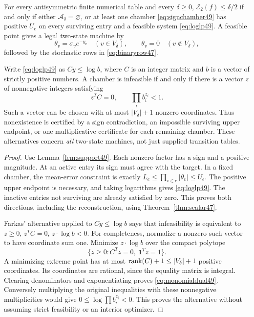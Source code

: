 \begin{theorem}\label{thm:duality49}
For every antisymmetric finite numerical table and every $\delta\ge0$,
$\mathcal E_2(f)\le\delta/2$ if and only if either
$\mathcal A_\delta=\varnothing$, or at least one chamber
\eqref{eq:signchamber49} has positive $U_e$ on every surviving entry
and a feasible system \eqref{eq:loglp49}. A feasible point gives a
legal two-state machine by
\[
 \theta_v=\sigma_v e^{-y_v}\quad(v\in V_\delta),\qquad
 \theta_v=0\quad(v\notin V_\delta),
\]
followed by the stochastic rows in \eqref{eq:binaryrow47}.

Write \eqref{eq:loglp49} as $Cy\le\log b$, where $C$ is an integer
matrix and $b$ is a vector of strictly positive numbers. A chamber is
infeasible if and only if there is a vector $z$ of nonnegative
integers satisfying
\begin{equation}\label{eq:monomialdual49}
 z^TC=0,\qquad \prod_i b_i^{z_i}<1.
\end{equation}
Such a vector can be chosen with at most $|V_\delta|+1$ nonzero
coordinates. Thus nonexistence is certified by a sign contradiction,
an impossible surviving upper endpoint, or one multiplicative
certificate for each remaining chamber. These alternatives concern
\emph{all} two-state machines, not just supplied transition tables.
\end{theorem}
\begin{proof}
Use Lemma~\ref{lem:support49}. Each nonzero factor has a sign and a
positive magnitude. At an active entry its sign must agree with the
target. In a fixed chamber, the mean-error constraint is exactly
$L_e\le\prod_{v\in e}|\theta_v|\le U_e$. The positive upper endpoint
is necessary, and taking logarithms gives \eqref{eq:loglp49}.
The inactive entries not surviving are already satisfied by zero.
This proves both directions, including the reconstruction, using
Theorem~\ref{thm:scalar47}.

Farkas' alternative applied to $Cy\le\log b$ says that infeasibility
is equivalent to $z\ge0$, $z^TC=0$, $z\cdot\log b<0$.
For completeness, normalize a nonzero such vector to have coordinate
sum one. Minimize $z\cdot\log b$ over the compact polytope
\[
 \{z\ge0:C^Tz=0,\ \boldsymbol1^Tz=1\}.
\]
A minimizing extreme point has at most $\operatorname{rank}(C)+1\le|V_\delta|+1$
positive coordinates. Its coordinates are rational, since the
equality matrix is integral. Clearing denominators and exponentiating
proves \eqref{eq:monomialdual49}. Conversely multiplying the original
inequalities with these nonnegative multiplicities would give
$0\le\log\prod b_i^{z_i}<0$. This proves the alternative without
assuming strict feasibility or an interior optimizer.
\end{proof}

